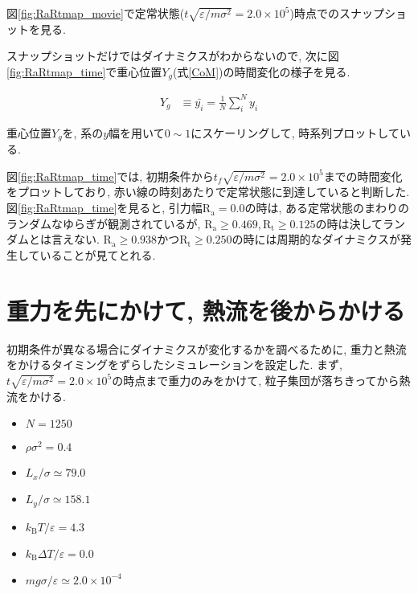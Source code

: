 図\ref{fig:RaRtmap_movie}で定常状態($t\sqrt{\varepsilon / m \sigma^2} = 2.0 \times 10^{5}$)時点でのスナップショットを見る.



スナップショットだけではダイナミクスがわからないので, 次に図\ref{fig:RaRtmap_time}で重心位置$Y_g$(式\eqref{CoM})の時間変化の様子を見る. 

\begin{align}
  \label{CoM}
  Y_g &\equiv \bar{y_i} = \frac{1}{N} \sum_{i}^{N} y_i
\end{align}

重心位置$Y_g$を, 系の$y$幅を用いて$0\sim 1$にスケーリングして, 時系列プロットしている.



図\ref{fig:RaRtmap_time}では, 初期条件から$t_f \sqrt{\varepsilon / m \sigma^2} = 2.0 \times 10^{5}$までの時間変化をプロットしており, 赤い線の時刻あたりで定常状態に到達していると判断した. 図\ref{fig:RaRtmap_time}を見ると, 引力幅$\text{R}_\text{a}=0.0$の時は, ある定常状態のまわりのランダムなゆらぎが観測されているが, $\text{R}_\text{a} \ge 0.469, \text{R}_\text{t} \ge 0.125$の時は決してランダムとは言えない. $\text{R}_\text{a} \ge 0.938 かつ\text{R}_\text{t} \ge 0.250$の時には周期的なダイナミクスが発生していることが見てとれる. 

\section{重力を先にかけて, 熱流を後からかける}\label{sec:RaRtmap_drop}

初期条件が異なる場合にダイナミクスが変化するかを調べるために, 重力と熱流をかけるタイミングをずらしたシミュレーションを設定した. まず, $t \sqrt{\varepsilon / m \sigma^2} = 2.0 \times 10^{5}$の時点まで重力のみをかけて, 粒子集団が落ちきってから熱流をかける. 

\begin{itemize}
  \item $N = 1250$
  \item $\rho \sigma^2 = 0.4$
  \item $L_x / \sigma \simeq 79.0$
  \item $L_y / \sigma \simeq 158.1$
  \item $k_{\text{B}} T/\varepsilon = 4.3$
  \item $k_{\text{B}} \Delta T/\varepsilon = 0.0$
  \item $mg\sigma/\varepsilon \simeq 2.0 \times 10^{-4}$
\end{itemize}


